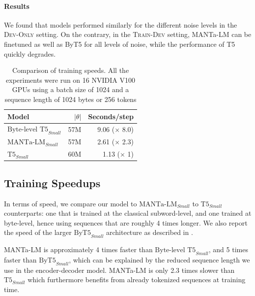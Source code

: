 
\paragraph{Results} We found that models performed similarly for the different noise levels in the \textsc{Dev-Only} setting. On the contrary, in the \textsc{Train-Dev} setting, MANTa-LM can be finetuned as well as ByT5 for all levels of noise, while the performance of T5 quickly degrades.

\begin{table}[t]
\centering\small
\begin{tabular}{lrr}
\toprule
Model                           & $|\theta|$ & Seconds/step         \\ \midrule
$\text{Byte-level T5}_{Small}$   & 57M       & 9.06 ($\times$ 8.0)  \\[3pt]
$\text{MANTa-LM}_{Small}$    & 57M        & 2.61 ($\times$ 2.3)    \\[3pt]
$\text{T5}_{Small}$      & 60M        & 1.13 ($\times$ 1)      \\ \bottomrule
\end{tabular}
\caption{Comparison of training speeds. All the experiments were run on 16 NVIDIA V100 GPUs using a batch size of 1024 and a sequence length of 1024 bytes or 256 tokens}
\label{tab:speed}
\end{table}

\subsection{Training Speedups}

In terms of speed, we compare our model to $\text{MANTa-LM}_{Small}$ to $\text{T5}_{Small}$ counterparts: one that is trained at the classical subword-level, and one trained at byte-level, hence using sequences that are roughly 4 times longer. We also report the speed of the larger $\text{ByT5}_{Small}$ architecture as described in \citet{xue2022byt5}.

MANTa-LM is approximately 4 times faster than $\text{Byte-level T5}_{Small}$, and 5 times faster than $\text{ByT5}_{Small}$, which can be explained by the reduced sequence length we use in the encoder-decoder model. MANTa-LM is only 2.3 times slower than $\text{T5}_{Small}$ which furthermore benefits from already tokenized sequences at training time.

